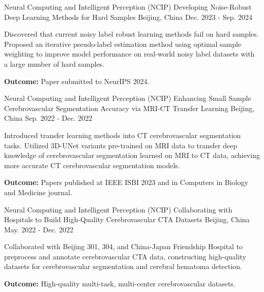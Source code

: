 \begin{cventries}
  \cventry
  {Neural Computing and Intelligent Perception (NCIP)}
  {Developing Noise-Robust Deep Learning Methods for Hard Samples}
  {Beijing, China}
  {Dec. 2023 - Sep. 2024}
  {
    \begin{cvitems}
      \item {Discovered that current noisy label robust learning methods fail on hard samples. Proposed an iterative pseudo-label estimation method using optimal sample weighting to improve model performance on real-world noisy label datasets with a large number of hard samples.}
      \item {\textbf{Outcome:} Paper submitted to NeurIPS 2024.}
    \end{cvitems}
  }
  \expsaddspace
  \cventry
  {Neural Computing and Intelligent Perception (NCIP)}
  {Enhancing Small Sample Cerebrovascular Segmentation Accuracy via MRI-CT Transfer Learning}
  {Beijing, China}
  {Sep. 2022 - Dec. 2022}
  {
    \begin{cvitems}
      \item {Introduced transfer learning methods into CT cerebrovascular segmentation tasks. Utilized 3D-UNet variants pre-trained on MRI data to transfer deep knowledge of cerebrovascular segmentation learned on MRI to CT data, achieving more accurate CT cerebrovascular segmentation models.}
      \item {\textbf{Outcome:} Papers published at IEEE ISBI 2023 and in Computers in Biology and Medicine journal.}
    \end{cvitems}
  }
  \expsaddspace
  \cventry
  {Neural Computing and Intelligent Perception (NCIP)}
  {Collaborating with Hospitals to Build High-Quality Cerebrovascular CTA Datasets}
  {Beijing, China}
  {May. 2022 - Dec. 2022}
  {
    \begin{cvitems}
      \item {Collaborated with Beijing 301, 304, and China-Japan Friendship Hospital to preprocess and annotate cerebrovascular CTA data, constructing high-quality datasets for cerebrovascular segmentation and cerebral hematoma detection.}
      \item {\textbf{Outcome:} High-quality multi-task, multi-center cerebrovascular datasets.}
    \end{cvitems}
  }
\end{cventries}
